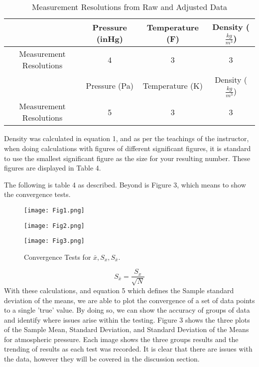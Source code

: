 \documentclass[conf]{new-aiaa}
\begin{document}
\begin{table}
    \begin{center}
    \begin{tabular}{||c c c c||}
        \hline
         & Pressure (inHg) & Temperature (F) & Density ($\frac{kg}{m^3}$)  \\ [0.5ex]
        \hline
        Measurement Resolutions & 4 & 3 & 3\\
        \hline\hline
         & Pressure (Pa) & Temperature (K) & Density ($\frac{kg}{m^3}$)  \\ [0.5ex]
        \hline
        Measurement Resolutions & 5 & 3 & 3\\
        \hline

    \end{tabular}
    \caption{Measurement Resolutions from Raw and Adjusted Data}
    \end{center}
\end{table}

Density was calculated in equation 1, and as per the teachings of the instructor, when doing calculations with figures of different significant figures, it is standard to use the smallest significant figure as the size for your resulting number. These figures are displayed in Table 4.
\par
The following is table 4 as described. Beyond is Figure 3, which means to show the convergence tests.

\begin{figure}
    \centering
    \texttt{[image: Fig1.png]}
    \label{fig:enter-label}
\end{figure}
\begin{figure}
    \centering
    \texttt{[image: Fig2.png]}
    \label{fig:enter-label}
\end{figure}
\begin{figure}
    \centering
    \texttt{[image: Fig3.png]}
    \caption{Convergence Tests for $\bar{x}, S_x, S_\bar{x}$.}
    \label{fig:enter-label}
\end{figure}
\pagebreak
\begin{equation}
    S_\bar{x} = \frac{S_x}{\sqrt{N}}
\end{equation}
With these calculations, and equation 5 which defines the Sample standard deviation of the means, we are able to plot the convergence of a set of data points to a single 'true' value. By doing so, we can show the accuracy of groups of data and identify where issues arise within the testing. Figure 3 shows the three plots of the Sample Mean, Standard Deviation, and Standard Deviation of the Means for atmospheric pressure. Each image shows the three groups results and the trending of results as each test was recorded. It is clear that there are issues with the data, however they will be covered in the discussion section.
\end{document}
